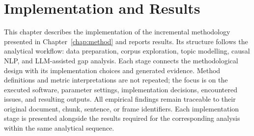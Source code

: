 \chapter{Implementation and Results}
\label{chap:implresults}
\graphicspath{{Chapter3/img/}}
\setlength{\emergencystretch}{2em}

This chapter describes the implementation of the incremental methodology presented
in Chapter~\ref{chap:method} and reports results. Its structure follows the
analytical workflow: data preparation, corpus exploration, topic modelling, causal
NLP, and LLM-assisted gap analysis. Each stage connects the methodological design
with its implementation choices and generated evidence. Method definitions and
metric interpretations are not repeated; the focus is on the executed software,
parameter settings, implementation decisions, encountered issues, and resulting
outputs. All empirical findings remain traceable to their original document, chunk,
sentence, or frame identifiers. Each implementation stage is presented alongside
the results required for the corresponding analysis within the same analytical
sequence.

